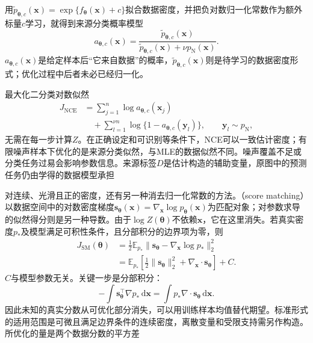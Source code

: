 用$\widetilde p_{\bm{\theta},c}(\bm{x})=\exp\{f_{\bm{\theta}}(\bm{x})+c\}$拟合数据密度，并把负对数归一化常数作为额外标量$c$学习，就得到来源分类概率模型
\[
  a_{\bm{\theta},c}(\bm{x})
  =\frac{\widetilde p_{\bm{\theta},c}(\bm{x})}
         {\widetilde p_{\bm{\theta},c}(\bm{x})
                +\nu p_{\mathrm{N}}(\bm{x})}.
\]
$a_{\bm{\theta},c}(\bm{x})$是给定样本后“它来自数据”的概率，$\widetilde p_{\bm{\theta},c}(\bm{x})$则是待学习的数据密度形式；优化过程中后者未必已经归一化。

最大化二分类对数似然
\[
  \begin{aligned}
    J_{\mathrm{NCE}}
      &=\sum_{j=1}^n\log a_{\bm{\theta},c}(\bm{x}_j)\\
      &\quad+\sum_{l=1}^{\nu n}
        \log\{1-a_{\bm{\theta},c}(\bm{y}_l)\},
        \qquad \bm{y}_l\sim p_{\mathrm{N}},
  \end{aligned}
\]
无需在每一步计算$Z$。在正确设定和可识别等条件下，NCE可以一致估计密度；有限噪声样本下优化的是来源分类似然，与MLE的数据似然不同。噪声覆盖不足或分类任务过易会影响参数信息。来源标签$D$是估计构造的辅助变量，原图中的预测任务仍由学得的数据模型承担

对连续、光滑且正的密度，还有另一种消去归一化常数的方法。（score matching）以数据空间中的对数密度梯度$\bm{s}_{\bm{\theta}}(\bm{x})=\nabla_{\bm{x}}\log p_{\bm{\theta}}(\bm{x})$为匹配对象；对参数求导的似然得分则是另一种导数。由于$\log Z(\bm{\theta})$不依赖$\bm{x}$，它在这里消失。若真实密度$p_*$及模型满足可积性条件，且分部积分的边界项为零，则
\begin{equation}
  \begin{aligned}
    J_{\mathrm{SM}}(\bm{\theta})
      &=\frac12\mathbb{E}_{p_*}
          \lVert\bm{s}_{\bm{\theta}}-\nabla_{\bm{x}}\log p_*\rVert_2^2\\
      &=\mathbb{E}_{p_*}\!\left[
          \frac12\lVert\bm{s}_{\bm{\theta}}\rVert_2^2+
          \nabla_{\bm{x}}\!\cdot\bm{s}_{\bm{\theta}}
        \right]+C.
  \end{aligned}
  \label{eq:pgm-parameter-learning-score-matching}
\end{equation}
$C$与模型参数无关。关键一步是分部积分：
\[
  -\int\bm{s}_{\bm{\theta}}^\top\nabla p_*\,\mathrm{d}\bm{x}
  =\int p_*\nabla\cdot\bm{s}_{\bm{\theta}}\,\mathrm{d}\bm{x}.
\]
因此未知的真实分数从可优化部分消失，可以用训练样本均值替代期望。标准形式的适用范围是可微且满足边界条件的连续密度，离散变量和受限支持需另作构造。所优化的量是两个数据分数的平方差

